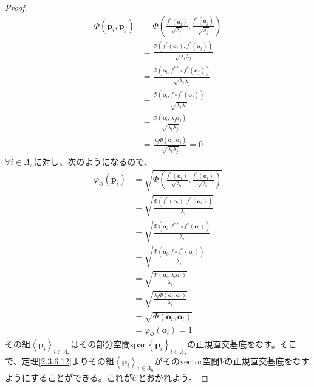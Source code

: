 \documentclass[dvipdfmx]{jsarticle}
\begin{document}
\begin{proof}
\begin{align*}
\varPhi\left( \mathbf{p}_{i},\mathbf{p}_{j} \right) &= \varPhi\left( \frac{f^{*}\left( \mathbf{o}_{i} \right)}{\sqrt{\lambda_{i}}},\frac{f^{*}\left( \mathbf{o}_{j} \right)}{\sqrt{\lambda_{j}}} \right)\\
&= \frac{\varPhi\left( f^{*}\left( \mathbf{o}_{i} \right),f^{*}\left( \mathbf{o}_{j} \right) \right)}{\sqrt{\lambda_{i}\lambda_{j}}}\\
&= \frac{\varPhi\left( \mathbf{o}_{i},f^{**} \circ f^{*}\left( \mathbf{o}_{j} \right) \right)}{\sqrt{\lambda_{i}\lambda_{j}}}\\
&= \frac{\varPhi\left( \mathbf{o}_{i},f \circ f^{*}\left( \mathbf{o}_{j} \right) \right)}{\sqrt{\lambda_{i}\lambda_{j}}}\\
&= \frac{\varPhi\left( \mathbf{o}_{i},\lambda_{j}\mathbf{o}_{j} \right)}{\sqrt{\lambda_{i}\lambda_{j}}}\\
&= \frac{\lambda_{j}\varPhi\left( \mathbf{o}_{i},\mathbf{o}_{j} \right)}{\sqrt{\lambda_{i}\lambda_{j}}} = 0
\end{align*}
$\forall i \in \varLambda_{\pi}$に対し、次のようになるので、
\begin{align*}
\varphi_{\varPhi}\left( \mathbf{p}_{i} \right) &= \sqrt{\varPhi\left( \frac{f^{*}\left( \mathbf{o}_{i} \right)}{\sqrt{\lambda_{i}}},\frac{f^{*}\left( \mathbf{o}_{i} \right)}{\sqrt{\lambda_{i}}} \right)}\\
&= \sqrt{\frac{\varPhi\left( f^{*}\left( \mathbf{o}_{i} \right),f^{*}\left( \mathbf{o}_{i} \right) \right)}{\lambda_{i}}}\\
&= \sqrt{\frac{\varPhi\left( \mathbf{o}_{i},f^{**} \circ f^{*}\left( \mathbf{o}_{i} \right) \right)}{\lambda_{i}}}\\
&= \sqrt{\frac{\varPhi\left( \mathbf{o}_{i},f \circ f^{*}\left( \mathbf{o}_{i} \right) \right)}{\lambda_{i}}}\\
&= \sqrt{\frac{\varPhi\left( \mathbf{o}_{i},\lambda_{i}\mathbf{o}_{i} \right)}{\lambda_{i}}}\\
&= \sqrt{\frac{\lambda_{i}\varPhi\left( \mathbf{o}_{i},\mathbf{o}_{i} \right)}{\lambda_{i}}}\\
&= \sqrt{\varPhi\left( \mathbf{o}_{i},\mathbf{o}_{i} \right)}\\
&= \varphi_{\varPhi}\left( \mathbf{o}_{i} \right) = 1
\end{align*}
その組$\left\langle \mathbf{p}_{i} \right\rangle_{i \in \varLambda_{\pi}}$はその部分空間$\mathrm{span}\left\{ \mathbf{p}_{i} \right\}_{i \in \varLambda_{\pi}}$の正規直交基底をなす。そこで、定理\ref{2.3.6.12}よりその組$\left\langle \mathbf{p}_{i} \right\rangle_{i \in \varLambda_{n}}$がそのvector空間$V$の正規直交基底をなすようにすることができる。これが$\mathcal{C}$とおかれよう。\par

\end{proof}
\end{document}
